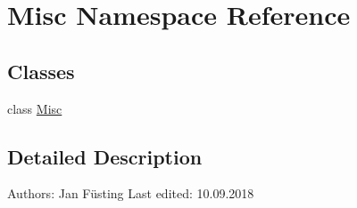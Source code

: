 \hypertarget{namespace_misc}{}\section{Misc Namespace Reference}
\label{namespace_misc}
\subsection*{Classes}
\begin{DoxyCompactItemize}
\item 
class \mbox{\hyperlink{class_misc_1_1_misc}{Misc}}
\end{DoxyCompactItemize}


\subsection{Detailed Description}
\begin{DoxyVerb}Authors:        Jan Füsting
Last edited:    10.09.2018
\end{DoxyVerb}
 